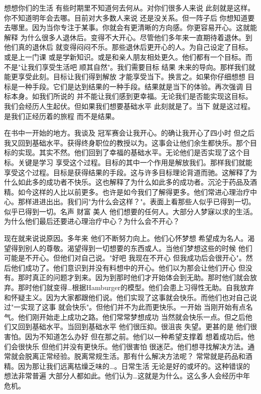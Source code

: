 想想你们的生活 有些时期里不知道何去何从。对你们很多人来说 此刻就是这样。你不知道明年会去哪。目前对大多数人来说 还是没关系。但一阵子后 你想知道要去哪里。因为当你专注于某事。你就会有更清晰的方向感。你更容易开心。这就能解释 为什么很多人退休后。变得不大开心。尽管他们多年来一直期待着退休。到他们真的退休后 就变得闷闷不乐。那些退休后更开心的人。为自己设定了目标。或是上一门课 或是学新知识。或是和亲人朋友相处更久。他们都有一个目标。而不是"让我们享受生活吧 顺其自然"。我们需要目标 结果 未来的导向。那样我们就能更享受此刻。目标让我们得到解放 才能享受当下。换言之。如果你仔细想想 目标是一种手段。它们是达到结果的一种手段。结果就是当下的体验。再次强调 目标本身。如我们所说的 并不能让我们感到更幸福。无论我们是否能实现这目标。我们会经历人生起伏。但如果我们想要基础水平 此刻就是了。当下 就是这过程。是我们正经历着的旅程 而不是结果。 

在书中一开始的地方。我谈及 冠军赛会让我开心。的确让我开心了四小时 但之后我又回到基础水平。获得终身职位的教授以为。这事会让他们余生都快乐。那个目标的实现。其实不然。他们回到了幸福的基础水平。无论他们是否实现了这个目标。关键是学习 享受这个过程。目标的其中一个作用是解放我们。那样我们就能享受这个过程。目标是获得结果的手段。这与许多目标理论背道而驰。这解释了为什么如此多的成功者不快乐。这也解释了为什么如此多的成功者。沉沦于药品及酒精。如今这样的人比以前更多。也许是如今我们了解得更多。他们常进心理治疗中心。那样进进出出。我们问"为什么会这样？"。表面上看那些人似乎已得到一切。似乎已得到一切。名声 财富 美人 他们想要的任何人。大部分人梦寐以求的生活。为什么他们最后还要进心理治疗中心？为什么会不开心？ 

现在就来说说原因。多年来 他们不断努力向上。他们心怀梦想 希望成为名人。渴望得到别人的尊敬。渴望得到一切想要的东西或人。当他们梦想这些的时候 他们可能是不开心。但他们对自己说。"好吧 我现在不开心 但我成功后会很开心"。然后他们成功了。他们意识到并没有料想中的开心。他们以为那会让他们开心 但没有。那时真正的问题才到来。因为到那时他们才开始体会到无助。那时他们就会放弃。那时他们就变得…根据Hamburger的模型。他们会患上习得性无助。自我放弃和怀疑主义。因为大家都跟他们说。他们实现了这事就会快乐。而他们也对自己说过"一实现了这事 就会快乐"。但他们并不为此而更快乐。一开始 当刚开始有点名气。他们刚开始走上成功之路。他们常常梦想成功 当然就会快乐一点。但之后他们又回到基础水平。当回到基础水平 他们很压抑。很沮丧 失望。更甚的是 他们很害怕。因为不知道怎么办好 但在那之前。他们以一种希望支撑着 想着成功后。他们会很快乐 但他们并没有更快乐。他们很害怕 很迷茫。他们想寻找解决方法。通常就会脱离正常经验。脱离常规生活。那有什么解决方法呢？ 常常就是药品和酒精。因为那让我们远离枯燥乏味的…。日常生活 无论是好的或坏的。这种错误的想法非常普遍 大部分人都如此。他们认为…这就是为什么。这么多人会经历中年危机。 

